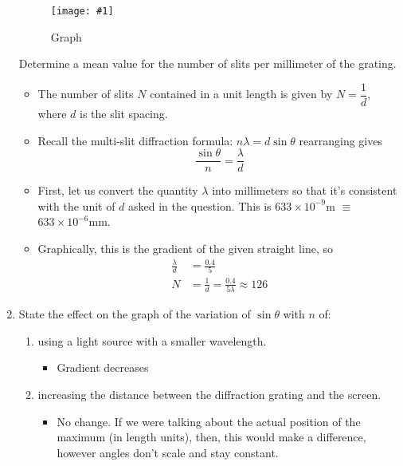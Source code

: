 \documentclass[a4paper,12pt]{article}
\newcommand{\img}[4]{\begin{center}
  \begin{figure}[H]
    \centering
    \texttt{[image: \#1]}
    \caption{#3}
    \label{fig:#4}
  \end{figure}
\end{center}}
\begin{document}
\begin{enumerate}
        \img{ex/8.png}{0.7}{Graph}{ex8}
        Determine a mean value for the number of slits per millimeter of the grating.
        \begin{itemize}
          \item The number of slits $N$ contained in a unit length is given by $N = \dfrac{1}{d}$, where $d$ is the slit spacing.
          \item Recall the multi-slit diffraction formula: $n\lambda = d\sin\theta$
                rearranging gives
                $$\frac{\sin\theta}{n} = \frac{\lambda}{d}$$
          \item First, let us convert the quantity $\lambda$ into millimeters so that it's consistent with the unit of $d$ asked in the question. This is $633 \times 10^{-9}$m $\equiv$ $633 \times 10^{-6}$mm.
          \item Graphically, this is the gradient of the given straight line, so
                \begin{align*}
                  \frac{\lambda}{d} & = \frac{0.4}{5}                      \\
                  N                 & = \frac{1}{d} = \frac{0.4}{5\lambda}
                  \approx 126
                \end{align*}
        \end{itemize}
  \item State the effect on the graph of the variation of $\sin\theta$ with $n$ of:
        \begin{enumerate}[label=(\roman*)]
          \item using a light source with a smaller wavelength.
                \begin{itemize}
                  \item Gradient decreases
                \end{itemize}
          \item increasing the distance between the diffraction grating and the screen.
                \begin{itemize}
                  \item No change. If we were talking about the actual position of the maximum (in length units), then, this would make a difference, however angles don't scale and stay constant.
                \end{itemize}
        \end{enumerate}
\end{enumerate}

\pagebreak
\end{document}
